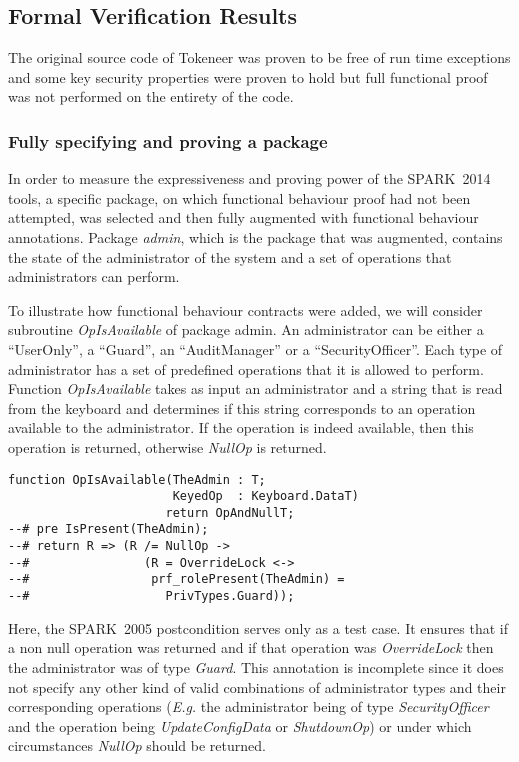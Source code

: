 \documentclass[10pt,a4paper,twocolumn]{article}
\newcommand{\oldspark}{SPARK~2005\xspace}
\newcommand{\newspark}{SPARK~2014\xspace}
\newcommand{\Eg}{\textit{E.g.}\xspace}
\begin{document}
\subsection{Formal Verification Results}

The original source code of Tokeneer was proven to be free of run time
exceptions and some key security properties were proven to hold but
full functional proof was not performed on the entirety of the code.

\subsubsection{Fully specifying and proving a package}

In order to measure the expressiveness and proving power of the
\newspark tools, a specific package, on which functional behaviour
proof had not been attempted, was selected and then fully augmented
with functional behaviour annotations. Package \emph{admin}, which is
the package that was augmented, contains the state of the
administrator of the system and a set of operations that
administrators can perform.

To illustrate how functional behaviour contracts were added, we will
consider subroutine \emph{OpIsAvailable} of package admin. An
administrator can be either a ``UserOnly'', a ``Guard'', an
``AuditManager'' or a ``SecurityOfficer''. Each type of administrator
has a set of predefined operations that it is allowed to
perform. Function \emph{OpIsAvailable} takes as input an administrator
and a string that is read from the keyboard and determines if this
string corresponds to an operation available to the administrator. If
the operation is indeed available, then this operation is returned,
otherwise \emph{NullOp} is returned.

\begin{lstlisting}[caption=\oldspark]
function OpIsAvailable(TheAdmin : T;
                       KeyedOp  : Keyboard.DataT)
                      return OpAndNullT;
--# pre IsPresent(TheAdmin);
--# return R => (R /= NullOp ->
--#                (R = OverrideLock <->
--#                 prf_rolePresent(TheAdmin) =
--#                   PrivTypes.Guard));
\end{lstlisting}
Here, the \oldspark postcondition serves only as a test case. It
ensures that if a non null operation was returned and if that
operation was \emph{OverrideLock} then the administrator was of type
\emph{Guard}. This annotation is incomplete since it does not specify
any other kind of valid combinations of administrator types and their
corresponding operations (\Eg the administrator being of type
\emph{SecurityOfficer} and the operation being \emph{UpdateConfigData}
or \emph{ShutdownOp}) or under which circumstances \emph{NullOp}
should be returned.
\end{document}

